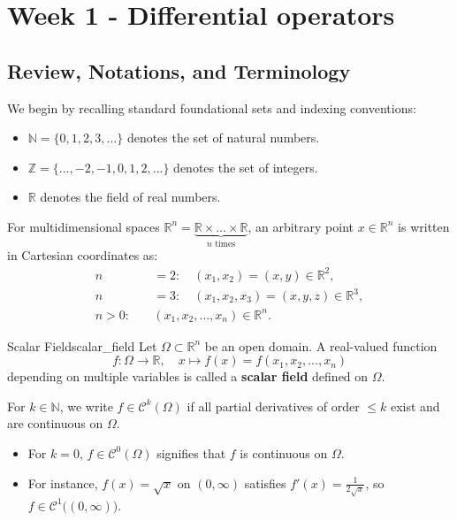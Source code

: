 
\chapter{Week 1 - Differential operators}

\section{Review, Notations, and Terminology}

We begin by recalling standard foundational sets and indexing conventions:
\begin{itemize}
    \item $\mathbb{N} = \{0, 1, 2, 3, \dots\}$ denotes the set of natural numbers.
    \item $\mathbb{Z} = \{\dots, -2, -1, 0, 1, 2, \dots\}$ denotes the set of integers.
    \item $\mathbb{R}$ denotes the field of real numbers.
\end{itemize}
For multidimensional spaces $\mathbb{R}^n = \underbrace{\mathbb{R} \times \dots \times \mathbb{R}}_{n \text{ times}}$, an arbitrary point $x \in \mathbb{R}^n$ is written in Cartesian coordinates as:
\begin{align}
    n &= 2 : \quad (x_1, x_2) = (x, y) \in \mathbb{R}^2, \\
    n &= 3 : \quad (x_1, x_2, x_3) = (x, y, z) \in \mathbb{R}^3, \\
    n > 0 : \quad &(x_1, x_2, \dots, x_n) \in \mathbb{R}^n.
\end{align}

\begin{definition}{Scalar Field}{scalar_field}
Let $\Omega \subset \mathbb{R}^n$ be an open domain. A real-valued function
\begin{equation}
    f : \Omega \longrightarrow \mathbb{R}, \quad x \longmapsto f(x) = f(x_1, x_2, \dots, x_n)
\end{equation}
depending on multiple variables is called a \textbf{scalar field} defined on $\Omega$.
\end{definition}

\begin{remarque}
For $k \in \mathbb{N}$, we write $f \in \mathcal{C}^k(\Omega)$ if all partial derivatives of order $\le k$ exist and are continuous on $\Omega$.
\begin{itemize}
    \item For $k = 0$, $f \in \mathcal{C}^0(\Omega)$ signifies that $f$ is continuous on $\Omega$.
    \item For instance, $f(x) = \sqrt{x}$ on $(0, \infty)$ satisfies $f'(x) = \frac{1}{2\sqrt{x}}$, so $f \in \mathcal{C}^1\bigl((0, \infty)\bigr)$.
\end{itemize}
\end{remarque}

